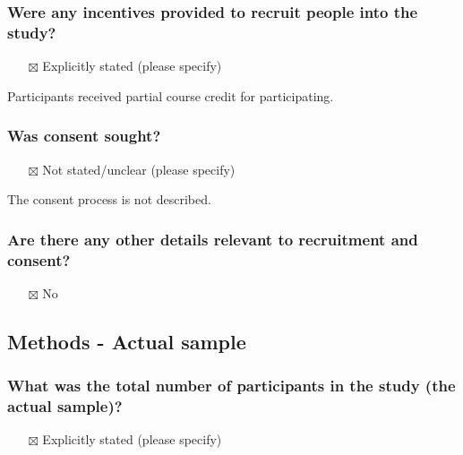 \documentclass[
  doc, a4paper]{apa7}
\providecommand{\tightlist}{%
  \setlength{\itemsep}{0pt}\setlength{\parskip}{0pt}}
\begin{document}
\subsubsection{Were any incentives provided to recruit people into the study?}\label{were-any-incentives-provided-to-recruit-people-into-the-study}

\begin{itemize}
\tightlist
\item[$\boxtimes$]
  Explicitly stated (please specify)
\end{itemize}

Participants received partial course credit for participating.

\subsubsection{Was consent sought?}\label{was-consent-sought}

\begin{itemize}
\tightlist
\item[$\boxtimes$]
  Not stated/unclear (please specify)
\end{itemize}

The consent process is not described.

\subsubsection{Are there any other details relevant to recruitment and consent?}\label{are-there-any-other-details-relevant-to-recruitment-and-consent}

\begin{itemize}
\tightlist
\item[$\boxtimes$]
  No
\end{itemize}

\subsection{Methods - Actual sample}\label{methods---actual-sample}

\subsubsection{What was the total number of participants in the study (the actual sample)?}\label{what-was-the-total-number-of-participants-in-the-study-the-actual-sample}

\begin{itemize}
\tightlist
\item[$\boxtimes$]
  Explicitly stated (please specify)
\end{itemize}
\end{document}
